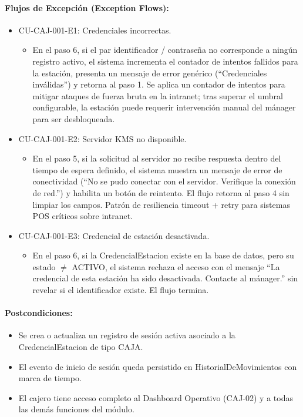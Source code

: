 \paragraph{Flujos de Excepción (Exception Flows):}
\begin{itemize}
    \item CU-CAJ-001-E1: Credenciales incorrectas.
    \begin{itemize}
        \item En el paso 6, si el par identificador / contraseña no corresponde a ningún registro activo, el sistema incrementa el contador de intentos fallidos para la estación, presenta un mensaje de error genérico (``Credenciales inválidas'') y retorna al paso 1. Se aplica un contador de intentos para mitigar ataques de fuerza bruta en la intranet; tras superar el umbral configurable, la estación puede requerir intervención manual del mánager para ser desbloqueada.
    \end{itemize}
    \item CU-CAJ-001-E2: Servidor KMS no disponible.
    \begin{itemize}
        \item En el paso 5, si la solicitud al servidor no recibe respuesta dentro del tiempo de espera definido, el sistema muestra un mensaje de error de conectividad (``No se pudo conectar con el servidor. Verifique la conexión de red.'') y habilita un botón de reintento. El flujo retorna al paso 4 sin limpiar los campos. Patrón de resiliencia timeout + retry para sistemas POS críticos sobre intranet.
    \end{itemize}
    \item CU-CAJ-001-E3: Credencial de estación desactivada.
    \begin{itemize}
        \item En el paso 6, si la CredencialEstacion existe en la base de datos, pero su estado $\neq$ ACTIVO, el sistema rechaza el acceso con el mensaje ``La credencial de esta estación ha sido desactivada. Contacte al mánager.'' sin revelar si el identificador existe. El flujo termina.
    \end{itemize}
\end{itemize}

\paragraph{Postcondiciones:}
\begin{itemize}
    \item Se crea o actualiza un registro de sesión activa asociado a la CredencialEstacion de tipo CAJA.
    \item El evento de inicio de sesión queda persistido en HistorialDeMovimientos con marca de tiempo.
    \item El cajero tiene acceso completo al Dashboard Operativo (CAJ-02) y a todas las demás funciones del módulo.
\end{itemize}


